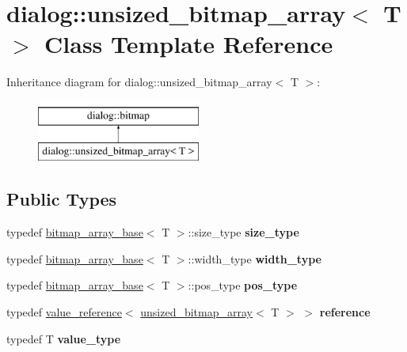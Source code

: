 \hypertarget{classdialog_1_1unsized__bitmap__array}{}\section{dialog\+:\+:unsized\+\_\+bitmap\+\_\+array$<$ T $>$ Class Template Reference}
\label{classdialog_1_1unsized__bitmap__array}
Inheritance diagram for dialog\+:\+:unsized\+\_\+bitmap\+\_\+array$<$ T $>$\+:\begin{figure}[H]
\begin{center}
\leavevmode
\includegraphics[height=2.000000cm]{classdialog_1_1unsized__bitmap__array}
\end{center}
\end{figure}
\subsection*{Public Types}
\begin{DoxyCompactItemize}
\item 
\mbox{\label{classdialog_1_1unsized__bitmap__array_a4fe55f99c731168e7f95545f0a0fcd2a}} 
typedef \hyperlink{classdialog_1_1bitmap__array__base}{bitmap\+\_\+array\+\_\+base}$<$ T $>$\+::size\+\_\+type {\bfseries size\+\_\+type}
\item 
\mbox{\label{classdialog_1_1unsized__bitmap__array_ad2a52dd64f8be340d5eb8fd7f631c0e3}} 
typedef \hyperlink{classdialog_1_1bitmap__array__base}{bitmap\+\_\+array\+\_\+base}$<$ T $>$\+::width\+\_\+type {\bfseries width\+\_\+type}
\item 
\mbox{\label{classdialog_1_1unsized__bitmap__array_ac7ad7cccd26c107aae84ac5323fb2ce5}} 
typedef \hyperlink{classdialog_1_1bitmap__array__base}{bitmap\+\_\+array\+\_\+base}$<$ T $>$\+::pos\+\_\+type {\bfseries pos\+\_\+type}
\item 
\mbox{\label{classdialog_1_1unsized__bitmap__array_a334227ffb88f529ae1e2d6700ad99041}} 
typedef \hyperlink{classdialog_1_1value__reference}{value\+\_\+reference}$<$ \hyperlink{classdialog_1_1unsized__bitmap__array}{unsized\+\_\+bitmap\+\_\+array}$<$ T $>$ $>$ {\bfseries reference}
\item 
\mbox{\label{classdialog_1_1unsized__bitmap__array_a93a78d41d8baa7829e551a09236ce1ff}} 
typedef T {\bfseries value\+\_\+type}
\end{DoxyCompactItemize}
